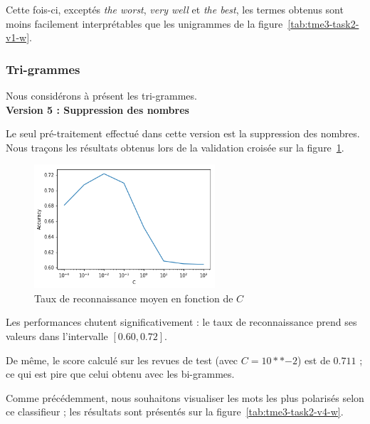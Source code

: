 \documentclass[a4paper]{article}
\newcommand{\figref}[1]{figure~\ref{#1}}
\begin{document}
Cette fois-ci, exceptés \emph{the worst}, \emph{very well} et \emph{the best},
les termes obtenus sont moins facilement interprétables que les unigrammes de la
\figref{tab:tme3-task2-v1-w}. \\

\subsubsection{Tri-grammes}

Nous considérons à présent les tri-grammes. \\

\textbf{Version 5 : Suppression des nombres}

Le seul pré-traitement effectué dans cette version est la suppression des
nombres. Nous traçons les résultats obtenus lors de la validation croisée sur la
\figref{img:tme2-task2-v4}.

\begin{figure}[H]
	\center 
	\includegraphics[width=0.6\textwidth]{images/tme2/task2_v4.png}
    \caption{Taux de reconnaissance moyen en fonction de $C$}
    \label{img:tme2-task2-v4}
\end{figure}

Les performances chutent significativement : le taux de reconnaissance
prend ses valeurs dans l'intervalle $[0.60, 0.72]$. 

De même, le score calculé sur les revues de test (avec $C=10**{-2}$) est de
$0.711$ ; ce qui est pire que celui obtenu avec les bi-grammes. 

Comme précédemment, nous souhaitons visualiser les mots les plus polarisés selon
ce classifieur ; les résultats sont présentés sur la
\figref{tab:tme3-task2-v4-w}.
\end{document}
